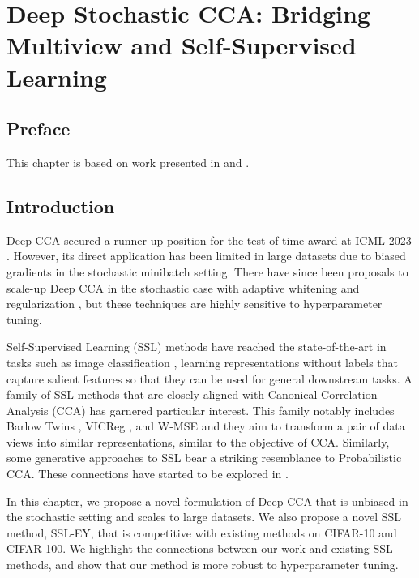 \graphicspath{{chapters/deep_learning/}}

\chapter{Deep Stochastic CCA: Bridging Multiview and Self-Supervised Learning}\label{ch:deep_learning}
\minitoc
\section*{Preface}

This chapter is based on work presented in \citet{chapman2023cca} and \citet{chapman2023efficient}.

\section{Introduction}

Deep CCA \citep{andrew2013deep} secured a runner-up position for the test-of-time award at ICML 2023 \citep{ICML2023TOT}.
However, its direct application has been limited in large datasets due to biased gradients in the stochastic minibatch setting.
There have since been proposals to scale-up Deep CCA in the stochastic case with adaptive whitening \citep{wang2015stochastic} and regularization \citep{chang2018scalable}, but these techniques are highly sensitive to hyperparameter tuning.

Self-Supervised Learning (SSL) methods have reached the state-of-the-art in tasks such as image classification \citep{balestriero2023cookbook}, learning representations without labels that capture salient features so that they can be used for general downstream tasks.
A family of SSL methods that are closely aligned with Canonical Correlation Analysis (CCA) has garnered particular interest.
This family notably includes Barlow Twins \citep{zbontar2021barlow}, VICReg \citep{bardes2021vicreg}, and W-MSE \citep{ermolov2021whitening} and they aim to transform a pair of data views into similar representations, similar to the objective of CCA. Similarly, some generative approaches to SSL\citep{sansone2022gedi} bear a striking resemblance to Probabilistic CCA\citep{bach2005probabilistic}.
These connections have started to be explored in \citet{balestriero2022contrastive}.

In this chapter, we propose a novel formulation of Deep CCA that is unbiased in the stochastic setting and scales to large datasets.
We also propose a novel SSL method, SSL-EY, that is competitive with existing methods on CIFAR-10 and CIFAR-100.
We highlight the connections between our work and existing SSL methods, and show that our method is more robust to hyperparameter tuning.

